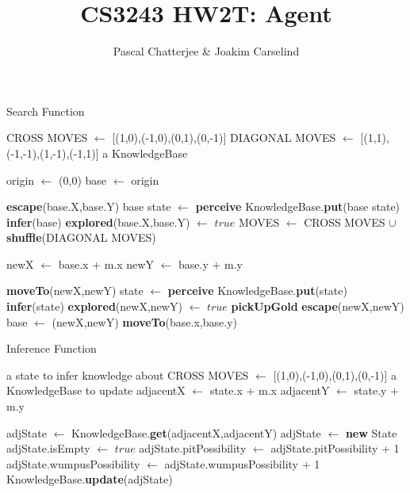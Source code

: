 \documentclass[11pt,a4paper]{article}
\author{Pascal Chatterjee & Joakim Carselind}
\title{CS3243 HW2T: Agent}
\begin{document}
 
\begin{algorithm}
\caption{Search Function}
\label{explore}

\begin{algorithmic}[1]

\REQUIRE CROSS MOVES $\leftarrow$ [(1,0),(-1,0),(0,1),(0,-1)]
\REQUIRE DIAGONAL MOVES $\leftarrow$ [(1,1),(-1,-1),(1,-1),(-1,1)]
\REQUIRE a KnowledgeBase

\STATE origin $\leftarrow$ (0,0)
\STATE base $\leftarrow$ origin

\LOOP
{}
\STATE \textbf{escape}(base.X,base.Y)
\ELSE 
\STATE base state $\leftarrow$ \textbf{perceive}
\STATE KnowledgeBase.\textbf{put}(base state)
\STATE \textbf{infer}(base)
\STATE \textbf{explored}(base.X,base.Y) $\leftarrow$ $true$
\STATE 
\STATE MOVES $\leftarrow$ CROSS MOVES $\cup$ \textbf{shuffle}(DIAGONAL MOVES)

\STATE newX $\leftarrow$ base.x $+$ m.x 
\STATE newY $\leftarrow$ base.y $+$ m.y

\STATE \textbf{moveTo}(newX,newY)
\STATE state $\leftarrow$ \textbf{perceive}
\STATE KnowledgeBase.\textbf{put}(state)
\STATE \textbf{infer}(state)
\STATE \textbf{explored}(newX,newY) $\leftarrow$ $true$
\STATE \textbf{pickUpGold}
\STATE \textbf{escape}(newX,newY)
\ENDIF
{}
\STATE base $\leftarrow$ (newX,newY)
\ELSE
\STATE \textbf{moveTo}(base.x,base.y)
\ENDIF
\ENDIF

\ENDFOR
\ENDIF
\ENDLOOP
\end{algorithmic}
\end{algorithm}

\newpage

\begin{algorithm}
\caption{Inference Function}
\label{infer}
\begin{algorithmic}[1]
\REQUIRE a state to infer knowledge about
\REQUIRE CROSS MOVES $\leftarrow$ [(1,0),(-1,0),(0,1),(0,-1)]
\REQUIRE a KnowledgeBase to update
\STATE adjacentX $\leftarrow$ state.x $+$ m.x 
\STATE adjacentY $\leftarrow$ state.y $+$ m.y

\STATE adjState $\leftarrow$ KnowledgeBase.\textbf{get}(adjacentX,adjacentY)
\ELSE
\STATE adjState $\leftarrow$ \textbf{new} State
\ENDIF
\STATE
{}
\STATE adjState.isEmpty $\leftarrow$ $true$
\ELSE
{}
\STATE adjState.pitPossibility $\leftarrow$ adjState.pitPossibility + 1
\ENDIF
{}
\STATE adjState.wumpusPossibility $\leftarrow$ adjState.wumpusPossibility + 1
\ENDIF
\ENDIF
\STATE KnowledgeBase.\textbf{update}(adjState)
\ENDFOR
\end{algorithmic}
\end{algorithm}
\end{document}
